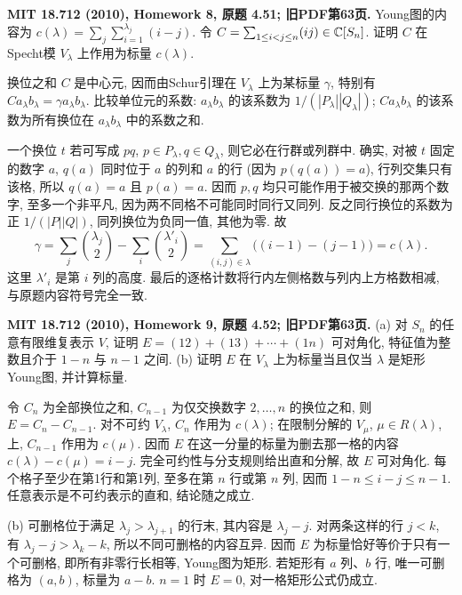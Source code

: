 \begin{exercise}\label{hw:4.51}
\textbf{MIT 18.712 (2010), Homework 8, 原题 4.51; 旧PDF第63页.}
Young图的内容为 $c(\lambda)=\sum_j\sum_{i=1}^{\lambda_j}(i-j)$. 令 $C=\sum_{1\le i<j\le n}(ij)\in\mathbb C[S_n]$. 证明 $C$ 在Specht模 $V_\lambda$ 上作用为标量 $c(\lambda)$.
\end{exercise}
\begin{solution}
换位之和 $C$ 是中心元, 因而由Schur引理在 $V_\lambda$ 上为某标量 $\gamma$, 特别有 $C a_\lambda b_\lambda=\gamma a_\lambda b_\lambda$. 比较单位元的系数: $a_\lambda b_\lambda$ 的该系数为 $1/(|P_\lambda||Q_\lambda|)$; $C a_\lambda b_\lambda$ 的该系数为所有换位在 $a_\lambda b_\lambda$ 中的系数之和.

一个换位 $t$ 若可写成 $pq$, $p\in P_\lambda,q\in Q_\lambda$, 则它必在行群或列群中. 确实, 对被 $t$ 固定的数字 $a$, $q(a)$ 同时位于 $a$ 的列和 $a$ 的行 (因为 $p(q(a))=a$), 行列交集只有该格, 所以 $q(a)=a$ 且 $p(a)=a$. 因而 $p,q$ 均只可能作用于被交换的那两个数字, 至多一个非平凡, 因为两不同格不可能同时同行又同列. 反之同行换位的系数为正 $1/(|P||Q|)$, 同列换位为负同一值, 其他为零. 故
\[
 \gamma=\sum_j\binom{\lambda_j}{2}-\sum_i\binom{\lambda'_i}{2}
 =\sum_{(i,j)\in\lambda}\bigl((i-1)-(j-1)\bigr)=c(\lambda).
\]
这里 $\lambda'_i$ 是第 $i$ 列的高度. 最后的逐格计数将行内左侧格数与列内上方格数相减, 与原题内容符号完全一致.
\end{solution}

\begin{exercise}\label{hw:4.52}
\textbf{MIT 18.712 (2010), Homework 9, 原题 4.52; 旧PDF第63页.}
(a) 对 $S_n$ 的任意有限维复表示 $V$, 证明 $E=(12)+(13)+\cdots+(1n)$ 可对角化, 特征值为整数且介于 $1-n$ 与 $n-1$ 之间.
(b) 证明 $E$ 在 $V_\lambda$ 上为标量当且仅当 $\lambda$ 是矩形Young图, 并计算标量.
\end{exercise}
\begin{solution}
令 $C_n$ 为全部换位之和, $C_{n-1}$ 为仅交换数字 $2,\ldots,n$ 的换位之和, 则 $E=C_n-C_{n-1}$. 对不可约 $V_\lambda$, $C_n$ 作用为 $c(\lambda)$; 在限制分解的 $V_\mu$, $\mu\in R(\lambda)$, 上, $C_{n-1}$ 作用为 $c(\mu)$. 因而 $E$ 在这一分量的标量为删去那一格的内容 $c(\lambda)-c(\mu)=i-j$. 完全可约性与分支规则给出直和分解, 故 $E$ 可对角化. 每个格子至少在第1行和第1列, 至多在第 $n$ 行或第 $n$ 列, 因而 $1-n\le i-j\le n-1$. 任意表示是不可约表示的直和, 结论随之成立.

(b) 可删格位于满足 $\lambda_j>\lambda_{j+1}$ 的行末, 其内容是 $\lambda_j-j$. 对两条这样的行 $j<k$, 有 $\lambda_j-j>\lambda_k-k$, 所以不同可删格的内容互异. 因而 $E$ 为标量恰好等价于只有一个可删格, 即所有非零行长相等, Young图为矩形. 若矩形有 $a$ 列、$b$ 行, 唯一可删格为 $(a,b)$, 标量为 $a-b$. $n=1$ 时 $E=0$, 对一格矩形公式仍成立.
\end{solution}

